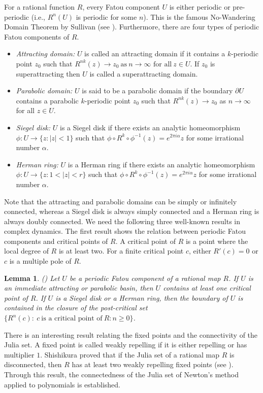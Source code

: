 \documentclass[12pt]{article}
\newtheorem{lem}{Lemma}[section]
\begin{document}
	
For a rational function $R$, every Fatou component $U$ is either periodic or pre-periodic (i.e., $R^n(U)$ is periodic for some $  n $). This is the famous No-Wandering Domain Theorem by Sullivan (see \cite[Theorem~8.1.2]{Beardon_book}). Furthermore, there are four types of periodic Fatou components of $R$.
\begin{itemize}
\item \textit{Attracting domain:} $U$ is called an attracting domain if it contains a $k$-periodic point $z_{0}$ such that $R^{nk}(z)\rightarrow z_{0}\ \mbox{as}\ n\rightarrow \infty \mbox{~for all}\ z\in U.$ If $z_0$ is superattracting then $U$ is called a superattracting domain.
\item \textit{Parabolic domain:} $U$ is said to be a parabolic domain if the boundary $\partial U$ contains a parabolic $k$-periodic point $z_{0}$ such that $R^{nk}(z)\rightarrow z_{0}$ as $n\rightarrow \infty$ for all $z\in U$. 
\item \textit{Siegel disk:} $U$ is a Siegel disk if there exists an analytic homeomorphism $\phi: U\rightarrow \{z:|z|<1\}$ such that $\phi \circ R^{k} \circ\phi^{-1}(z)=e^{2 \pi i \alpha} z$ for some irrational number $\alpha$. 
\item \textit{Herman ring:} $U$ is a Herman ring if there exists an analytic homeomorphism $\phi:U\rightarrow \{z:1<|z|<r\}$ such that $\phi \circ R^{k} \circ\phi^{-1}(z)=e^{2 \pi i \alpha} z$ for some irrational number $\alpha$.
	\end{itemize}
	
	Note that the   attracting and parabolic domains can be  simply or infinitely connected, whereas a Siegel disk is always simply connected and a Herman ring is always doubly connected.
	We need the following three well-known results in complex dynamics. The first result shows the relation between periodic Fatou components and critical points of $R$.  A critical point of $R$ is a point where the local degree of $R$ is at least two. For a finite critical point $c$, either $R'(c)=0$ or $c$ is a multiple pole of $R$.
 	
	\begin{lem} (\cite{Beardon_book}) \label{cpoint}
		Let $U$ be a periodic Fatou component of a rational map $R$.  
		If $U$ is an immediate attracting or parabolic basin, then $U$ contains at least one critical point of $R$. If $U$ is a Siegel disk or a Herman ring, then the boundary of $U$ is contained in the closure of the post-critical set   $\{R^n (c):   ~c~\mbox{is a critical point of}~R: n \geq 0\}$.
	\end{lem}
	There is an interesting result relating the fixed points and the connectivity of the Julia set. 	A fixed point is called weakly repelling if it is either repelling or has multiplier $1$. Shishikura proved that if the Julia set of a rational map $R$ is disconnected, then $R$ has at least two weakly repelling fixed points (see \cite[Theorem~1]{Shishikura2009}). Through this result, the connectedness of the Julia set of Newton's method applied to polynomials is established.
	
\end{document}
